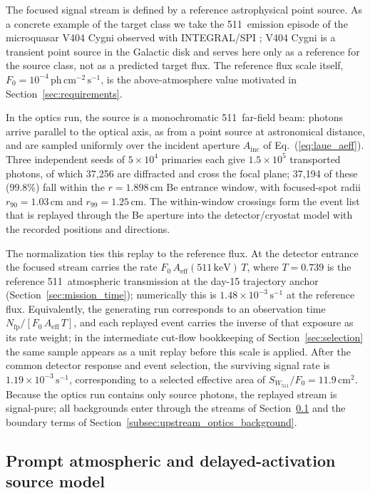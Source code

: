 \documentclass[pdflatex,sn-mathphys-num]{sn-jnl}
\newcommand{\keV}{\,\mathrm{keV}}
\newcommand{\phcms}{\,\mathrm{ph\,cm^{-2}\,s^{-1}}}
\newcommand{\cps}{\,\mathrm{s^{-1}}}
\newcommand{\wii}{W_{511}}
\newcommand{\aeff}{A_{\mathrm{eff}}}
\newcommand{\fzero}{F_{0}}
\begin{document}
The focused signal stream is defined by a reference astrophysical point
source. As a concrete example of the target class we take the 511\keV{}
emission episode of the microquasar V404 Cygni observed with INTEGRAL/SPI
\cite{Siegert2016V404}; V404 Cygni is a transient point source in the Galactic
disk and serves here only as a reference for the source class, not as a
predicted target flux. The reference flux scale itself,
$\fzero=10^{-4}\phcms$, is the above-atmosphere value motivated in
Section~\ref{sec:requirements}.

In the optics run, the source is a monochromatic 511\keV{} far-field beam:
photons arrive parallel to the optical axis, as from a point source at
astronomical distance, and are sampled uniformly over the incident aperture
$A_{\mathrm{inc}}$ of Eq.~(\ref{eq:laue_aeff}). Three independent seeds of
$5\times10^{4}$ primaries each give $1.5\times10^{5}$ transported photons, of
which 37,256 are diffracted and cross the focal plane; 37,194 of these
(99.8\%) fall within the $r=1.898\,\mathrm{cm}$ Be entrance window, with
focused-spot radii $r_{90}=1.03\,\mathrm{cm}$ and $r_{99}=1.25\,\mathrm{cm}$.
The within-window crossings form the event list that is replayed through the
Be aperture into the detector/cryostat model with the recorded positions and
directions.

The normalization ties this replay to the reference flux. At the detector
entrance the focused stream carries the rate
$\fzero\,\aeff(511\keV)\,T$, where $T=0.739$ is the reference 511\keV{}
atmospheric transmission at the day-15 trajectory anchor
(Section~\ref{sec:mission_time}); numerically this is
$1.48\times10^{-3}\cps$ at the reference flux. Equivalently, the generating
run corresponds to an observation time $N_{\mathrm{fp}}/[\fzero\,\aeff\,T]$,
and each replayed event carries the inverse of that exposure as its rate
weight; in the intermediate cut-flow bookkeeping of
Section~\ref{sec:selection} the same sample appears as a unit replay before
this scale is applied. After the common detector response and event selection,
the surviving signal rate is $1.19\times10^{-3}\cps$, corresponding to a
selected effective area of $S_{\wii}/\fzero=11.9\,\mathrm{cm^2}$. Because the
optics run contains only source photons, the replayed stream is signal-pure;
all backgrounds enter through the streams of Section~\ref{sec:background} and
the boundary terms of Section~\ref{subsec:upstream_optics_background}.

\subsection{Prompt atmospheric and delayed-activation source model}
\label{sec:background}
\end{document}
